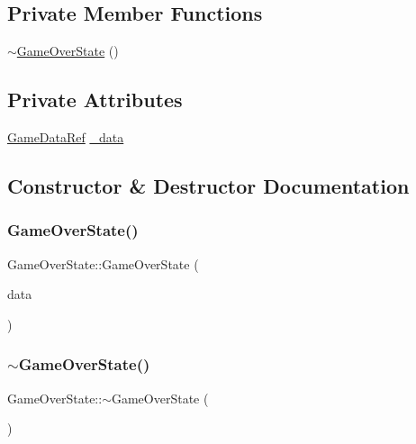 \subsection*{Private Member Functions}
\begin{DoxyCompactItemize}
\item 
\hyperlink{classGameOverState_a6450295ac3a2d64a19bdfe1ad70aacad}{$\sim$\+Game\+Over\+State} ()
\end{DoxyCompactItemize}
\subsection*{Private Attributes}
\begin{DoxyCompactItemize}
\item 
\hyperlink{game_8h_a513c9dd465a0df41dbb4daf40cc717c2}{Game\+Data\+Ref} \hyperlink{classGameOverState_aa3f7f4b44aff376ce1b4aec52fece514}{\+\_\+data}
\end{DoxyCompactItemize}


\subsection{Constructor \& Destructor Documentation}
\mbox{\label{classGameOverState_a90dea0468b4719169fd8f5d157e20baf}} 
\subsubsection{\texorpdfstring{Game\+Over\+State()}{GameOverState()}}
{\footnotesize\ttfamily Game\+Over\+State\+::\+Game\+Over\+State (\begin{DoxyParamCaption}\item[{\hyperlink{game_8h_a513c9dd465a0df41dbb4daf40cc717c2}{Game\+Data\+Ref}}]{data }\end{DoxyParamCaption})}

\mbox{\label{classGameOverState_a6450295ac3a2d64a19bdfe1ad70aacad}} 
\subsubsection{\texorpdfstring{$\sim$\+Game\+Over\+State()}{~GameOverState()}}
{\footnotesize\ttfamily Game\+Over\+State\+::$\sim$\+Game\+Over\+State (\begin{DoxyParamCaption}{ }\end{DoxyParamCaption})\hspace{0.3cm}{\ttfamily [private]}}



